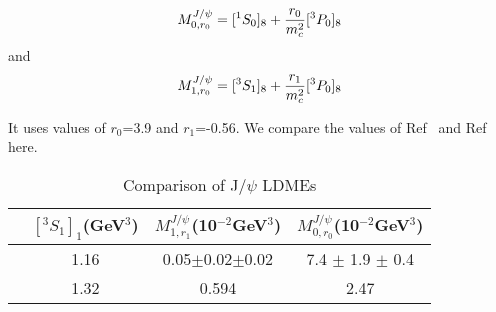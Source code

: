 \documentclass[aps,prc,preprint,superscriptaddress,showpacs,showkeys,amsmath]{revtex4-1}
\begin{document}
\begin{enumerate}
{\begin{equation}
M^{J/\psi}_{0,r_{0}} = [^1S_0]_{8}  + \frac{r_{0}}{m_{c}^{2}}[^3P_0]_{8}\\ \nonumber
\end{equation}
and
\begin{equation}
M^{J/\psi}_{1,r_{0}} = [^3S_1]_{8}  + \frac{r_{1}}{m_{c}^{2}}[^3P_0]_{8}\\ \nonumber
\end{equation}

It uses values of $r_{0}$=3.9 and $r_{1}$=-0.56. We compare the values of Ref~\cite{Butenschoen:2010rq}
and Ref~\cite{Ma:2010jj} here.

}
\begin{table}[h]
\caption{Comparison of J/$\psi$ LDMEs}
\begin{tabular}{|l|c|c|c|}
\hline            
                             &$[^3S_1]_{1}$(GeV$^3$)                     &$M^{J/\psi}_{1,r_{1}}$(10$^{-2}$GeV$^3$)    &$M^{J/\psi}_{0,r_{0}}$(10$^{-2}$GeV$^3$)  \\        
\hline
\cite{Ma:2010jj}             &1.16                                     &0.05$\pm$0.02$\pm$0.02              &7.4 $\pm$ 1.9 $\pm$ 0.4 \\
\cite{Butenschoen:2010rq}    &1.32                                     &0.594                               &2.47 \\
\hline
\end{tabular}
\label{table:LDMEJPsiNLO}
\end{table}



\end{enumerate}


\end{document}

